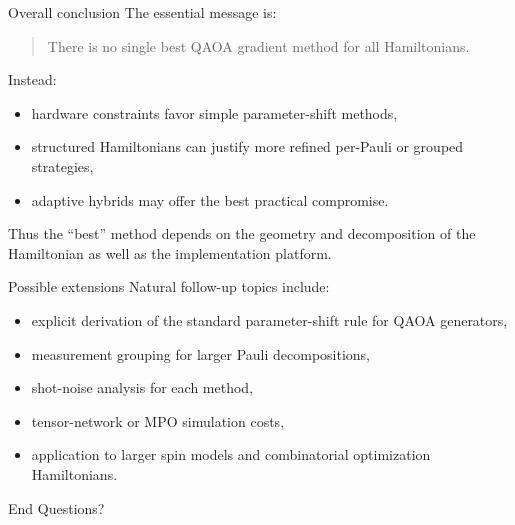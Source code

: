 \documentclass[aspectratio=169]{beamer}
\begin{document}
\begin{frame}{Overall conclusion}
The essential message is:
\begin{quote}
There is no single best QAOA gradient method for all Hamiltonians.
\end{quote}

Instead:
\begin{itemize}
\item hardware constraints favor simple parameter-shift methods,
\item structured Hamiltonians can justify more refined per-Pauli or grouped strategies,
\item adaptive hybrids may offer the best practical compromise.
\end{itemize}

Thus the ``best'' method depends on the geometry and decomposition of the Hamiltonian as well as the implementation platform.
\end{frame}

\begin{frame}{Possible extensions}
Natural follow-up topics include:
\begin{itemize}
\item explicit derivation of the standard parameter-shift rule for QAOA generators,
\item measurement grouping for larger Pauli decompositions,
\item shot-noise analysis for each method,
\item tensor-network or MPO simulation costs,
\item application to larger spin models and combinatorial optimization Hamiltonians.
\end{itemize}
\end{frame}

\begin{frame}{End}
\centering
{\Large Questions?}
\end{frame}
\end{document}
